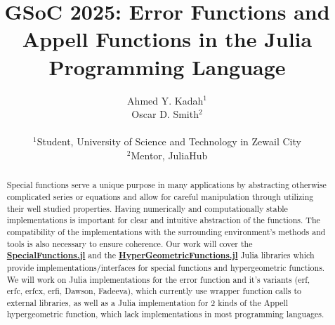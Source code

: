 \documentclass{article}
\title{GSoC 2025: Error Functions and Appell Functions in the Julia Programming Language}
\author{Ahmed Y. Kadah$^1$  
\\Oscar D. Smith$^2$ 
\\\\$^1$Student, University of Science and Technology in Zewail City
\\ $^2$Mentor, JuliaHub}
\date{}
\theoremstyle{mytheoremstyle}
\theoremstyle{mytheoremstyle}
\theoremstyle{myproblemstyle}
\begin{document}
    \maketitle


  \begin{abstract}
    Special functions serve a unique purpose in many applications by abstracting otherwise complicated series or equations and allow for careful manipulation through utilizing their well studied properties. 
    Having numerically and computationally stable implementations is important for clear and intuitive abstraction of the functions.
    The compatibility of the implementations with the surrounding environment's methods and tools is also necessary to ensure coherence.
    Our work will cover the \href{https://github.com/JuliaMath/SpecialFunctions.jl}{\textbf{SpecialFunctions.jl}} and the \href{https://github.com/JuliaMath/HypergeometricFunctions.jl/issues}{\textbf{HyperGeometricFunctions.jl}} Julia libraries which provide implementations/interfaces for special functions and hypergeometric functions.
    We will work on Julia implementations for the error function and it's variants (erf, erfc, erfcx, erfi, Dawson, Fadeeva), which currently use wrapper function calls to external libraries,  as well as a Julia implementation for 2 kinds of the Appell hypergeometric function, which lack implementations in most programming languages.
  \end{abstract}
\end{document}
